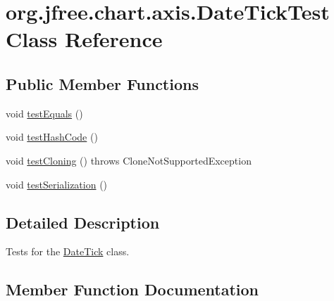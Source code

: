 \hypertarget{classorg_1_1jfree_1_1chart_1_1axis_1_1_date_tick_test}{}\section{org.\+jfree.\+chart.\+axis.\+Date\+Tick\+Test Class Reference}
\label{classorg_1_1jfree_1_1chart_1_1axis_1_1_date_tick_test}
\subsection*{Public Member Functions}
\begin{DoxyCompactItemize}
\item 
void \mbox{\hyperlink{classorg_1_1jfree_1_1chart_1_1axis_1_1_date_tick_test_a02683055683aedc8ac051d99bad056a6}{test\+Equals}} ()
\item 
void \mbox{\hyperlink{classorg_1_1jfree_1_1chart_1_1axis_1_1_date_tick_test_a5aec37031756371a22e85fcbf7df90b3}{test\+Hash\+Code}} ()
\item 
void \mbox{\hyperlink{classorg_1_1jfree_1_1chart_1_1axis_1_1_date_tick_test_a00efac8996e0e88325d202793a63f24a}{test\+Cloning}} ()  throws Clone\+Not\+Supported\+Exception 
\item 
void \mbox{\hyperlink{classorg_1_1jfree_1_1chart_1_1axis_1_1_date_tick_test_a82b4dd2de1f7e3f4c85b398b23a37e22}{test\+Serialization}} ()
\end{DoxyCompactItemize}


\subsection{Detailed Description}
Tests for the \mbox{\hyperlink{classorg_1_1jfree_1_1chart_1_1axis_1_1_date_tick}{Date\+Tick}} class. 

\subsection{Member Function Documentation}
\mbox{\label{classorg_1_1jfree_1_1chart_1_1axis_1_1_date_tick_test_a00efac8996e0e88325d202793a63f24a}} 
